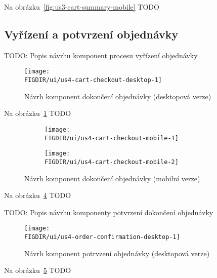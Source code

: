 Na obrázku~\ref{fig:us3-cart-summary-mobile} TODO

\subsection{Vyřízení a potvrzení objednávky}
\label{subsec:narvh-ui-transformace-uzivatelskych-pribehu-vyrideni-a-potvrzeni-objednavky}
\userstorycheckout

TODO: Popis návrhu komponent procesu vyřízení objednávky

\begin{figure}[H]
    \centering
    \texttt{[image: \\FIGDIR/ui/us4-cart-checkout-desktop-1]}
    \caption{Návrh komponent dokončení objednávky (desktopová verze)}
    \label{fig:us4-cart-checkout-desktop}
\end{figure}

Na obrázku~\ref{fig:us4-cart-checkout-desktop} TODO

\begin{figure}[H]
    \centering
    \begin{subfigure}{0.4\textwidth}
        \texttt{[image: \\FIGDIR/ui/us4-cart-checkout-mobile-1]}
        \label{fig:us4-cart-checkout-mobile-1}
    \end{subfigure}
    \hfill
    \begin{subfigure}{0.4\textwidth}
        \texttt{[image: \\FIGDIR/ui/us4-cart-checkout-mobile-2]}
        \label{fig:us4-cart-checkout-mobile-2}
    \end{subfigure}

    \caption{Návrh komponent dokončení objednávky (mobilní verze)}
    \label{fig:us4-cart-checkout-mobile}
\end{figure}

Na obrázku~\ref{fig:us4-cart-checkout-mobile} TODO

TODO: Popis návrhu komponenty potvrzení dokončení objednávky

\begin{figure}[H]
    \centering
    \texttt{[image: \\FIGDIR/ui/us4-order-confirmation-desktop-1]}
    \caption{Návrh komponent potrvzení objednávky (desktopová verze)}
    \label{fig:us4-order-confirmation-desktop}
\end{figure}

Na obrázku~\ref{fig:us4-order-confirmation-desktop} TODO

